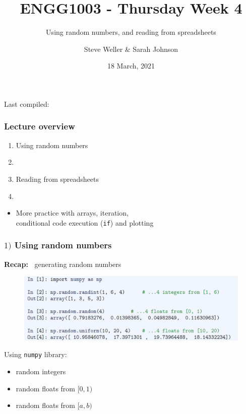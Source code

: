 \documentclass[english,14pt]{beamer}
\title{ENGG1003 - Thursday Week 4}
\subtitle{Using random numbers, and reading from spreadsheets}
\author{Steve Weller \& Sarah Johnson}
\institute{University of Newcastle}
\date{18 March, 2021}
\begin{document}
\begin{flushleft}
{\scriptsize Last compiled:~\DTMnow}
\vspace*{-5mm}
\end{flushleft}
\framebreak


\begin{frame}[fragile]

\frametitle{Lecture overview}
\begin{enumerate}
	\item Using random numbers


	\item[]
	
	\item Reading from spreadsheets

	\item[]
\end{enumerate}

\begin{itemize}
	\item More practice with arrays, iteration, \\ conditional code execution (\texttt{if}) and plotting
\end{itemize}

\end{frame}


\begin{frame}[fragile]

\frametitle{$1)$ Using random numbers}

\textbf{Recap:~} generating random numbers

\begin{figure}[ht]
	\centering
	\includegraphics[width=\textwidth]{figures/LLp55b}
\end{figure}
\vspace*{-3mm}
Using \texttt{numpy} library:
\begin{itemize}
	\item random integers
	\item random floats from $[0,1)$
	\item random floats from $[a,b)$
\end{itemize}

\end{frame}
\end{document}

